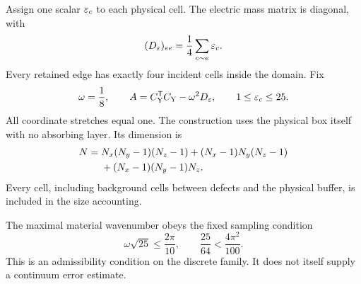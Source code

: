 Assign one scalar $\varepsilon_c$ to each physical cell. The electric mass matrix is diagonal, with
\begin{equation}\label{d:eq:cell-average}
 (D_\varepsilon)_{ee}=\frac14\sum_{c\sim e}\varepsilon_c.
\end{equation}
Every retained edge has exactly four incident cells inside the domain. Fix
\begin{equation}\label{d:eq:maxwell-model}
 \omega=\frac18,\qquad
 A=C_{\rm Y}^{\mathsf T}C_{\rm Y}-\omega^2D_\varepsilon,
 \qquad 1\le\varepsilon_c\le25.
\end{equation}
All coordinate stretches equal one. The construction uses the physical box itself with no absorbing layer. Its dimension is
\begin{align}\label{d:eq:yee-dimension}
 N={}&N_x(N_y-1)(N_z-1)+(N_x-1)N_y(N_z-1)\notag\\
 &+(N_x-1)(N_y-1)N_z.
\end{align}
Every cell, including background cells between defects and the physical buffer, is included in the size accounting.

The maximal material wavenumber obeys the fixed sampling condition
\begin{equation}\label{d:eq:resolution}
 \omega\sqrt{25}\le\frac{2\pi}{10},
 \qquad \frac{25}{64}<\frac{4\pi^2}{100}.
\end{equation}
This is an admissibility condition on the discrete family. It does not itself supply a continuum error estimate.

